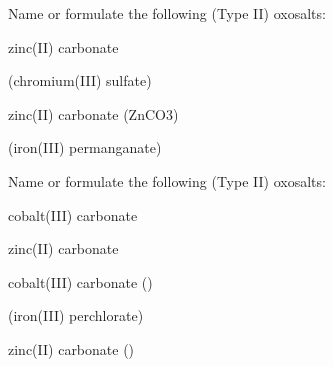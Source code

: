 \documentclass[main.tex]{subfiles}
\begin{document}
\begin{multicols*}{2}
\begin{question}[ID=\the\value{numA}]
Name or formulate the following (Type II) oxosalts:
\begin{inparaenum}[(a)]
\item {}	 		%
\item zinc(II) carbonate		%
\item {}	 	%
\end{inparaenum}
\end{question}
\begin{solution}
\begin{inparaenum}[(a)]
\item {}	 		 (chromium(III) sulfate)
\item zinc(II) carbonate		 (ZnCO3)
\item {}	 	 (iron(III) permanganate)	
 \end{inparaenum}\hspace{0.1cm}\end{solution}
\begin{question}[ID=\the\value{numA}]
Name or formulate the following (Type II) oxosalts:
\begin{inparaenum}[(a)]	
\item cobalt(III) carbonate		%
\item {}	 		%
\item zinc(II) carbonate		%
\end{inparaenum}
\end{question}
\begin{solution}
\begin{inparaenum}[(a)]
\item cobalt(III) carbonate		 ()
\item {}	 		(iron(III) perchlorate)
\item zinc(II) carbonate		 ()
 \end{inparaenum}\hspace{0.1cm}\end{solution}


\end{multicols*}
\end{document}
